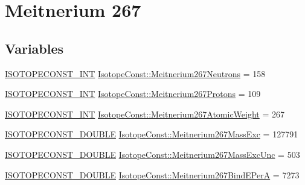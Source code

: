 \hypertarget{group___isotope_const-_meitnerium-_mt267}{}\section{Meitnerium 267}
\label{group___isotope_const-_meitnerium-_mt267}
\subsection*{Variables}
\begin{DoxyCompactItemize}
\item 
\mbox{\hyperlink{group___isotope_const-_macros_ga5f18360b3e99483a35c32d789e62621c}{I\+S\+O\+T\+O\+P\+E\+C\+O\+N\+S\+T\+\_\+\+I\+NT}} \mbox{\hyperlink{group___isotope_const-_meitnerium-_mt267_gaa66a606b2b83abe99190bacbcd1b7d83}{Isotope\+Const\+::\+Meitnerium267\+Neutrons}} = 158
\item 
\mbox{\hyperlink{group___isotope_const-_macros_ga5f18360b3e99483a35c32d789e62621c}{I\+S\+O\+T\+O\+P\+E\+C\+O\+N\+S\+T\+\_\+\+I\+NT}} \mbox{\hyperlink{group___isotope_const-_meitnerium-_mt267_ga6cb0d7e77cac8afec00654a319bbb1d0}{Isotope\+Const\+::\+Meitnerium267\+Protons}} = 109
\item 
\mbox{\hyperlink{group___isotope_const-_macros_ga5f18360b3e99483a35c32d789e62621c}{I\+S\+O\+T\+O\+P\+E\+C\+O\+N\+S\+T\+\_\+\+I\+NT}} \mbox{\hyperlink{group___isotope_const-_meitnerium-_mt267_gaf53be318d650e0a7d1d95b93393af772}{Isotope\+Const\+::\+Meitnerium267\+Atomic\+Weight}} = 267
\item 
\mbox{\hyperlink{group___isotope_const-_macros_ga8f45a7272ce02c0b4c65c44636ed719a}{I\+S\+O\+T\+O\+P\+E\+C\+O\+N\+S\+T\+\_\+\+D\+O\+U\+B\+LE}} \mbox{\hyperlink{group___isotope_const-_meitnerium-_mt267_ga7033017b90d7a3af9e2ffb63d861722e}{Isotope\+Const\+::\+Meitnerium267\+Mass\+Exc}} = 127791
\item 
\mbox{\hyperlink{group___isotope_const-_macros_ga8f45a7272ce02c0b4c65c44636ed719a}{I\+S\+O\+T\+O\+P\+E\+C\+O\+N\+S\+T\+\_\+\+D\+O\+U\+B\+LE}} \mbox{\hyperlink{group___isotope_const-_meitnerium-_mt267_gafb122585042687f36baea123ec2ebe0b}{Isotope\+Const\+::\+Meitnerium267\+Mass\+Exc\+Unc}} = 503
\item 
\mbox{\hyperlink{group___isotope_const-_macros_ga8f45a7272ce02c0b4c65c44636ed719a}{I\+S\+O\+T\+O\+P\+E\+C\+O\+N\+S\+T\+\_\+\+D\+O\+U\+B\+LE}} \mbox{\hyperlink{group___isotope_const-_meitnerium-_mt267_ga00ee1e8cbac95e6644166019a5c87f08}{Isotope\+Const\+::\+Meitnerium267\+Bind\+E\+PerA}} = 7273
\item 

\end{DoxyCompactItemize}
